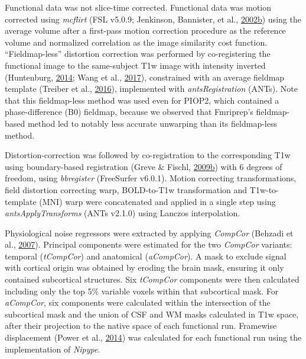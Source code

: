 \documentclass[11pt,american,a4paper,oneside,]{memoir} %
\begin{document}
Functional data was not slice-time corrected. Functional data was motion corrected using \emph{mcflirt} (FSL v5.0.9; Jenkinson, Bannister, et al., \protect\hyperlink{ref-Jenkinson2002-wm}{2002}\protect\hyperlink{ref-Jenkinson2002-wm}{b}) using the average volume after a first-pass motion correction procedure as the reference volume and normalized correlation as the image similarity cost function. ``Fieldmap-less'' distortion correction was performed by co-registering the functional image to the same-subject T1w image with intensity inverted (Huntenburg, \protect\hyperlink{ref-Huntenburg2014-ps}{2014}; Wang et al., \protect\hyperlink{ref-Wang2017-nk}{2017}), constrained with an average fieldmap template (Treiber et al., \protect\hyperlink{ref-Treiber2016-mc}{2016}), implemented with \emph{antsRegistration} (ANTs). Note that this fieldmap-less method was used even for PIOP2, which contained a phase-difference (B0) fieldmap, because we observed that Fmriprep's fieldmap-based method led to notably less accurate unwarping than its fieldmap-less method.

Distortion-correction was followed by co-registration to the corresponding T1w using boundary-based registration (Greve \& Fischl, \protect\hyperlink{ref-Greve2009-da}{2009}\protect\hyperlink{ref-Greve2009-da}{b}) with 6 degrees of freedom, using \emph{bbregister} (FreeSurfer v6.0.1). Motion correcting transformations, field distortion correcting warp, BOLD-to-T1w transformation and T1w-to-template (MNI) warp were concatenated and applied in a single step using \emph{antsApplyTransforms} (ANTs v2.1.0) using Lanczos interpolation.

Physiological noise regressors were extracted by applying \emph{CompCor} (Behzadi et al., \protect\hyperlink{ref-Behzadi2007-eb}{2007}). Principal components were estimated for the two \emph{CompCor} variants: temporal (\emph{tCompCor}) and anatomical (\emph{aCompCor}). A mask to exclude signal with cortical origin was obtained by eroding the brain mask, ensuring it only contained subcortical structures. Six \emph{tCompCor} components were then calculated including only the top 5\% variable voxels within that subcortical mask. For \emph{aCompCor}, six components were calculated within the intersection of the subcortical mask and the union of CSF and WM masks calculated in T1w space, after their projection to the native space of each functional run. Framewise displacement (Power et al., \protect\hyperlink{ref-Power2014-gh}{2014}) was calculated for each functional run using the implementation of \emph{Nipype}.
\end{document}
